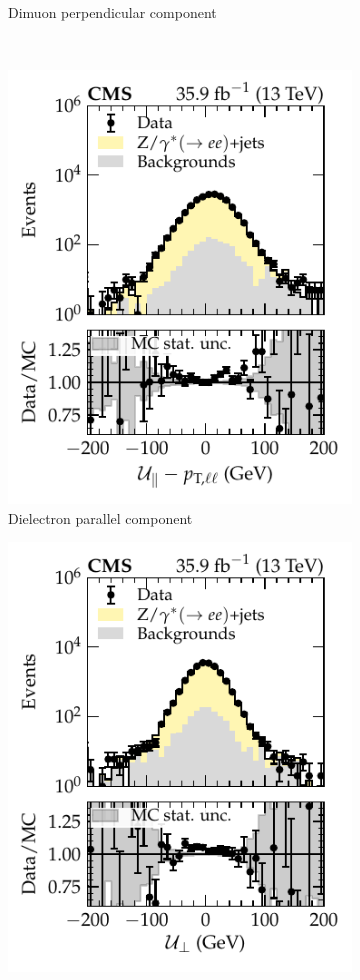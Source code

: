 \begin{figure}[htb]
\begin{subfigure}[b]{0.49\textwidth}
        \caption{Dimuon perpendicular component}
        \label{subfigb:recoil-calib-dists}
    \end{subfigure}
    \\
    \begin{subfigure}[b]{0.49\textwidth}
        \centering
        \includegraphics{chapters/041_corrections/images/ptmiss_calib/metres_para_ee_incdist.pdf}
        \caption{Dielectron parallel component}
        \label{subfigc:recoil-calib-dists}
    \end{subfigure}
    \hfill
    \begin{subfigure}[b]{0.49\textwidth}
        \centering
        \includegraphics{chapters/041_corrections/images/ptmiss_calib/metres_perp_ee_incdist.pdf}

\end{subfigure}
\end{figure}
